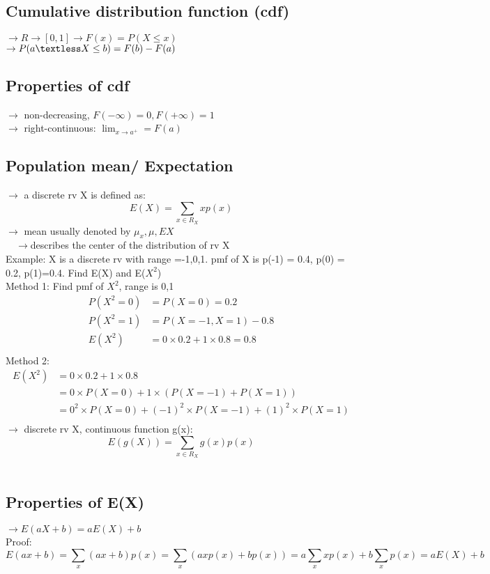 \documentclass{article}
\begin{document}
\subsection{Cumulative distribution function (cdf)}
$\rightarrow R \rightarrow [0,1] \rightarrow F(x) = P(X \leq x)$\\
$\rightarrow P(a \textless X \leq b) = F(b) -F(a)$\\
\subsection{Properties of cdf}
$\rightarrow$ non-decreasing, $F(-\infty) =0, F(+\infty)=1$\\
$\rightarrow$ right-continuous: $\lim_{x \rightarrow a^+} = F(a)$
\subsection{Population mean/ Expectation}
$\rightarrow$ a discrete rv X is defined as: \\
\[E(X) = \sum_{x \in R_X}x p(x) \]
$\rightarrow$ mean usually denoted by $\mu_x, \mu, EX$\\
$\quad \rightarrow $describes the center of the distribution of rv X\\
Example: X is a discrete rv with range ={-1,0,1}. pmf of X is p(-1) = 0.4, p(0) = 0.2, p(1)=0.4. Find E(X) and E($X^2$)\\
Method 1: Find pmf of $X^2$, range is {0,1}
\begin{align*}
P(X^2 =0) &= P(X=0) = 0.2\\
P(X^2 =1) &= P(X=-1,X=1) -0.8\\
E(X^2) &= 0 \times 0.2 + 1 \times 0.8 = 0.8\\
\end{align*}
Method 2:
\begin{align*}
    E(X^2) &= 0 \times 0.2 + 1 \times 0.8\\
    &= 0 \times P(X=0) + 1 \times (P(X=-1)+P(X=1))\\
    &= 0^2 \times P(X=0) + (-1)^2 \times P(X=-1) + (1)^2 \times P(X=1)\\
\end{align*}
$\rightarrow$ discrete rv X, continuous function g(x):\\
\[E(g(X)) = \sum_{x\in R_X} g(x)p(x)\]\\
\subsection{Properties of E(X)}
$\rightarrow E(aX+b) = aE(X) + b$\\
Proof:
\[E(ax+b) = \sum_{x} (ax+b)p(x) = \sum_{x}(axp(x)+bp(x)) = a \sum_{x} xp(x) + b\sum_{x}p(x) = aE(X)+b\] \\
\end{document}
